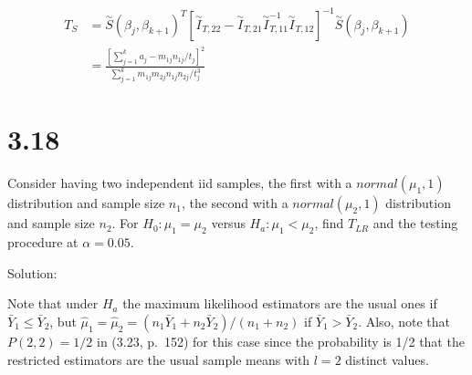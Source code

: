 \documentclass[
  letterpaper,
  DIV=11,
  numbers=noendperiod]{scrreprt}
\begin{document}
\[\begin{aligned}
T_S &= \overset \sim S(\beta_j, \beta_{k+1})^T [\overset \sim I_{T,22} -\overset \sim I_{T,21} \overset \sim I_{T,11}^{-1} \overset \sim I_{T,12} ]^{-1}\overset \sim S(\beta_j, \beta_{k+1})\\
&=\frac{\left[\sum_{j=1}^k a_j-m_{1j}n_{1j}/t_j\right]^2}{\sum_{j=1}^km_{1j}m_{2j}n_{1j}n_{2j}/t_j^3}
\end{aligned}\]

\hypertarget{section-25}{%
\section{3.18}\label{section-25}}

Consider having two independent iid samples, the first with a
\(normal(\mu_1,1)\) distribution and sample size \(n_1\), the second
with a \(normal(\mu_2,1)\) distribution and sample size \(n_2\). For
\(H_0: \mu_1= \mu_2\) versus \(H_a: \mu_1 < \mu_2\), find \(T_{LR}\) and
the testing procedure at \(\alpha = 0.05\).

Solution:

Note that under \(H_a\) the maximum likelihood estimators are the usual
ones if \(\bar Y_1 \leq \bar Y_2\), but
\(\hat \mu_1 = \hat \mu_2 = (n_1 \bar Y_1 +n_2 \bar Y _2)/(n_1+n_2)\) if
\(\bar Y_1 > \bar Y_2\). Also, note that \(P(2,2) = 1/2\) in (3.23,
p.~152) for this case since the probability is 1/2 that the restricted
estimators are the usual sample means with \(l=2\) distinct values.
\end{document}
